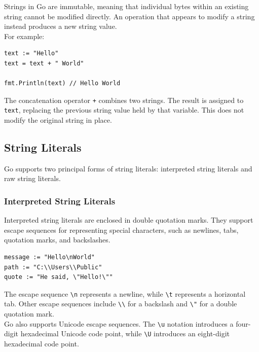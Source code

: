 Strings in Go are immutable, meaning that individual bytes within an existing string cannot be modified directly. An operation that appears to modify a string instead produces a new string value.\\

For example:

\begin{lstlisting}
text := "Hello"
text = text + " World"

fmt.Println(text) // Hello World
\end{lstlisting}

The concatenation operator \texttt{+} combines two strings. The result is assigned to \texttt{text}, replacing the previous string value held by that variable. This does not modify the original string in place.

\subsection{String Literals}

Go supports two principal forms of string literals: interpreted string literals and raw string literals.

\subsubsection{Interpreted String Literals}

Interpreted string literals are enclosed in double quotation marks. They support escape sequences for representing special characters, such as newlines, tabs, quotation marks, and backslashes.

\begin{lstlisting}
message := "Hello\nWorld"
path := "C:\\Users\\Public"
quote := "He said, \"Hello!\""
\end{lstlisting}

The escape sequence \texttt{\textbackslash n} represents a newline, while \texttt{\textbackslash t} represents a horizontal tab. Other escape sequences include \texttt{\textbackslash\textbackslash} for a backslash and \texttt{\textbackslash"} for a double quotation mark.\\

Go also supports Unicode escape sequences. The \texttt{\textbackslash u} notation introduces a four-digit hexadecimal Unicode code point, while \texttt{\textbackslash U} introduces an eight-digit hexadecimal code point.

